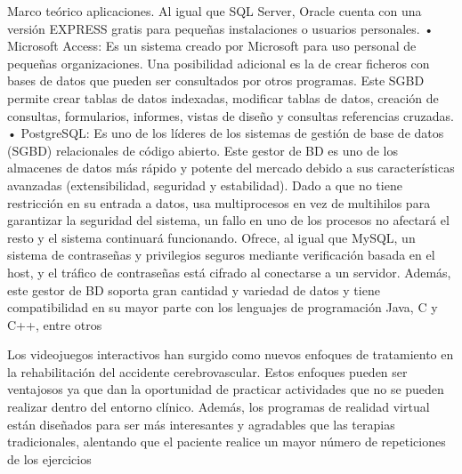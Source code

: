 \begin{thesischapter}{1} {Marco teórico}
    aplicaciones. Al igual que SQL Server, Oracle cuenta con una versión EXPRESS gratis para
    pequeñas instalaciones o usuarios personales.
    • Microsoft Access: Es un sistema creado por Microsoft para uso personal de pequeñas
    organizaciones. Una posibilidad adicional es la de crear ficheros con bases de datos que
    pueden ser consultados por otros programas. Este SGBD permite crear tablas de datos
    indexadas, modificar tablas de datos, creación de consultas, formularios, informes, vistas de
    diseño y consultas referencias cruzadas.
    • PostgreSQL: Es uno de los líderes de los sistemas de gestión de base de datos (SGBD)
    relacionales de código abierto. Este gestor de BD es uno de los almacenes de datos más rápido
    y potente del mercado debido a sus características avanzadas (extensibilidad, seguridad y
    estabilidad). Dado a que no tiene restricción en su entrada a datos, usa multiprocesos en vez
    de multihilos para garantizar la seguridad del sistema, un fallo en uno de los procesos no
    afectará el resto y el sistema continuará funcionando. Ofrece, al igual que MySQL, un sistema
    de contraseñas y privilegios seguros mediante verificación basada en el host, y el tráfico de
    contraseñas está cifrado al conectarse a un servidor. Además, este gestor de BD soporta gran
    cantidad y variedad de datos y tiene compatibilidad en su mayor parte con los lenguajes de
    programación Java, C y C++, entre otros

    \vspace{10pt}
    Los videojuegos interactivos han surgido como nuevos enfoques de tratamiento en
    la rehabilitación del accidente cerebrovascular. Estos enfoques pueden ser
    ventajosos ya que dan la oportunidad de practicar actividades que no se pueden
    realizar dentro del entorno clínico. Además, los programas de realidad virtual están
    diseñados para ser más interesantes y agradables que las terapias tradicionales,
    alentando que el paciente realice un mayor número de repeticiones de los ejercicios~\cite{laver2018virtual,alfageme2002aprendiendo}


\end{thesischapter}
